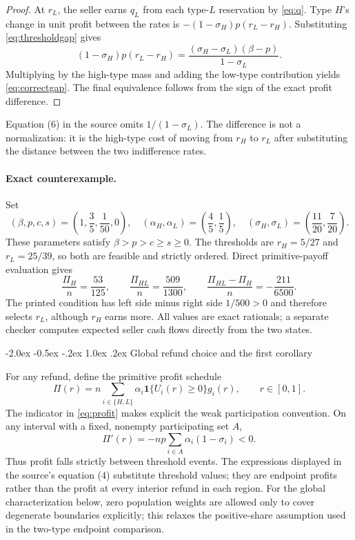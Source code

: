 \documentclass[12pt]{article}
\makeatletter
\renewcommand\section{\@startsection{section}{1}{\z@}%
  {-2.0ex \@plus -0.5ex \@minus -.2ex}%
  {1.0ex \@plus .2ex}%
  {\centering\normalfont\bfseries\fontsize{14}{16}\selectfont}}
\makeatother
\begin{document}
\begin{proof}
At $r_L$, the seller earns $q_L$ from each type-$L$ reservation by \eqref{eq:q}. Type $H$'s change in unit profit between the rates is $-(1-\sigma_H)p(r_L-r_H)$. Substituting \eqref{eq:thresholdgap} gives
\[
 (1-\sigma_H)p(r_L-r_H)
 =\frac{(\sigma_H-\sigma_L)(\beta-p)}{1-\sigma_L}.
\]
Multiplying by the high-type mass and adding the low-type contribution yields \eqref{eq:correctgap}. The final equivalence follows from the sign of the exact profit difference.
\end{proof}

Equation (6) in the source omits $1/(1-\sigma_L)$. The difference is not a normalization: it is the high-type cost of moving from $r_H$ to $r_L$ after substituting the distance between the two indifference rates.

\paragraph{Exact counterexample.}
Set
\[
 (\beta,p,c,s)=\left(1,\frac35,\frac1{50},0\right),\quad
 (\alpha_H,\alpha_L)=\left(\frac45,\frac15\right),\quad
 (\sigma_H,\sigma_L)=\left(\frac{11}{20},\frac7{20}\right).
\]
These parameters satisfy $\beta>p>c\geq s\geq0$. The thresholds are $r_H=5/27$ and $r_L=25/39$, so both are feasible and strictly ordered. Direct primitive-payoff evaluation gives
\[
 \frac{\Pi_H}{n}=\frac{53}{125},\qquad
 \frac{\Pi_{HL}}{n}=\frac{509}{1300},\qquad
 \frac{\Pi_{HL}-\Pi_H}{n}=-\frac{211}{6500}.
\]
The printed condition has left side minus right side $1/500>0$ and therefore selects $r_L$, although $r_H$ earns more. All values are exact rationals; a separate checker computes expected seller cash flows directly from the two states.

\section{Global refund choice and the first corollary}

For any refund, define the primitive profit schedule
\begin{equation}
 \Pi(r)=n\sum_{i\in\{H,L\}}\alpha_i\mathbf{1}\{U_i(r)\geq0\}g_i(r),\qquad r\in[0,1].
 \label{eq:profit}
\end{equation}
The indicator in \eqref{eq:profit} makes explicit the weak participation convention. On any interval with a fixed, nonempty participating set $A$,
\begin{equation}
 \Pi'(r)=-np\sum_{i\in A}\alpha_i(1-\sigma_i)<0.
 \label{eq:slope}
\end{equation}
Thus profit falls strictly between threshold events. The expressions displayed in the source's equation (4) substitute threshold values; they are endpoint profits rather than the profit at every interior refund in each region. For the global characterization below, zero population weights are allowed only to cover degenerate boundaries explicitly; this relaxes the positive-share assumption used in the two-type endpoint comparison.
\end{document}
